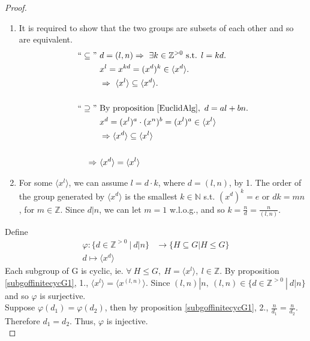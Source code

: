 \documentclass{article}
\theoremstyle{definition}
\theoremstyle{remark}
\begin{document}
\begin{proof}~
	\begin{enumerate}
		\item It is required to show that the two groups are subsets of each other and so are equivalent.
		      \begin{align*}
			      ``\subseteq" ~ & d=(l,n)\Rightarrow~\exists k\in\mathbb{Z}^{>0}\text{ s.t. } l=kd. \\
			                     & x^l=x^{kd}=(x^d)^k\in\langle x^d\rangle.                          \\
			                     & \Rightarrow~\langle x^l\rangle\subseteq \langle x^d\rangle.       \\
			      ~              & ~                                                                 \\
			      ``\supseteq" ~ & \text{By proposition }	\ref{EuclidAlg},~d=al+bn.                  \\
			                     & x^d=(x^l)^a\cdot(x^n)^b=(x^l)^a\in\langle x^l\rangle              \\
			                     & \Rightarrow \langle x^d\rangle \subseteq \langle x^l\rangle       \\
			      ~              & ~                                                                 \\
			      \Rightarrow~   & \langle x^d\rangle = \langle x^l\rangle
		      \end{align*}
		\item For some $\langle x^l\rangle$, we can assume $l=d\cdot k$, where $d=(l,n)$, by 1. The order of the group generated by $\langle x^d\rangle$ is the smallest $k\in \mathbb{N}$ s.t. $(x^d)^k=e$ or $dk=mn$, for $m\in\mathbb{Z}$. Since $d|n$, we can let $m=1$ w.l.o.g., and so $k=\frac{n}{d}=\frac{n}{(l,n)}$.
	\end{enumerate}
	Define
	\begin{align*}
		\varphi: \lbrace d\in\mathbb{Z}^{>0}~|~d|n\rbrace & \rightarrow \lbrace H \subseteq G | H\leq G\rbrace \\
		d\mapsto\langle x^d\rangle
	\end{align*}
	Each subgroup of G is cyclic, ie. $\forall~H\leq G,~H=\langle x^l\rangle,~l\in\mathbb{Z}$. By proposition \ref{subgoffinitecycG1}, 1., $\langle x^l\rangle=\langle x^{(l,n)}\rangle$. Since $(l,n)|n,~(l,n)\in \lbrace d\in\mathbb{Z}^{>0}~|~d|n\rbrace$ and so $\varphi$ is surjective.\\
	\indent Suppose $\varphi(d_1)=\varphi(d_2)$, then by proposition \ref{subgoffinitecycG1}, 2., $\frac{n}{d_1}=\frac{n}{d_2}$. Therefore $d_1=d_2$. Thus, $\varphi$ is injective.\\
\end{proof}
\end{document}
